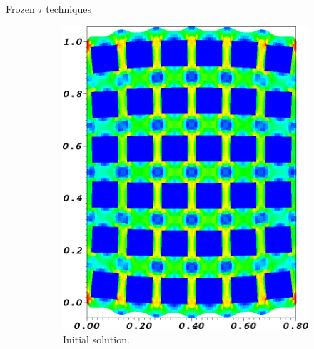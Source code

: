 \documentclass[final,t]{beamer}
\begin{document}
\begin{frame}{}
\begin{columns}
\begin{column}{0.31\textwidth}
\begin{block}{Frozen $\tau$ techniques}
\begin{figure}
\begin{subfigure}[b]{0.18\textwidth}
            \includegraphics[width=\textwidth]{figures/MG/ElasticityCompressTrim}
            \caption{\scriptsize Initial solution.}\label{fig:elast-initial}
          \end{subfigure} ~
          \begin{subfigure}[b]{0.18\textwidth}

\end{subfigure}
\end{figure}
\end{block}
\end{column}
\end{columns}
\end{frame}
\end{document}
